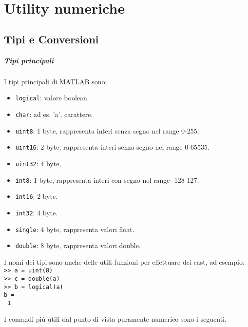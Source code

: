 \chapter{Utility numeriche}

\section{Tipi e Conversioni}

\paragraph{Tipi principali}

I tipi principali di MATLAB sono:

\begin{itemize}
    \item	\texttt{logical}: valore boolean.
    \item	\texttt{char}: ad es. 'a', carattere.
    \item	\texttt{uint8}: 1 byte, rappresenta interi senza segno nel range 0-255.
    \item	\texttt{uint16}: 2 byte, rappresenta interi senza segno nel range 0-65535.
    \item	\texttt{uint32}: 4 byte, 
    \item	\texttt{int8}: 1 byte, rappresenta interi con segno nel range -128-127. 
    \item	\texttt{int16}: 2 byte.
    \item	\texttt{int32}: 4 byte.
    \item	\texttt{single}: 4 byte, rappresenta valori float.
    \item	\texttt{double}: 8 byte, rappresenta valori double.
\end{itemize}

I nomi dei tipi sono anche delle utili funzioni per effettuare dei cast, ad esempio:\\
\texttt{>> a = uint(8)} \\
\texttt{>> c = double(a)} \\
\texttt{>> b = logical(a)} \\
\texttt{b = } \\
\texttt{\hspace{0.5cm} 1} \break

I comandi più utili dal punto di vista puramente numerico sono i seguenti.

\newpage

